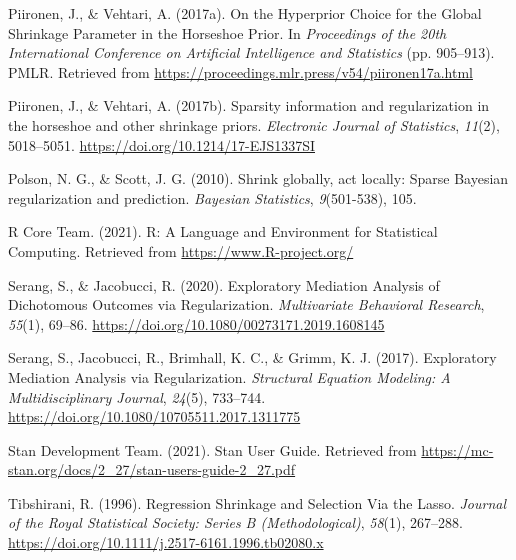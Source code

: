 \documentclass[
  man, donotrepeattitle,floatsintext]{apa6}
\newlength{\cslhangindent}
\newlength{\cslentryspacingunit} %
\newenvironment{CSLReferences}[2] %
 {%
  \setlength{\parindent}{0pt}
  \ifodd #1
  \let\oldpar\par
  \def\par{\hangindent=\cslhangindent\oldpar}
  \fi
  \setlength{\parskip}{#2\cslentryspacingunit}
 }%
 {}
\begin{document}
\begin{CSLReferences}{1}{0}
\leavevmode{}%
Piironen, J., \& Vehtari, A. (2017a). On the {Hyperprior} {Choice} for the {Global} {Shrinkage} {Parameter} in the {Horseshoe} {Prior}. In \emph{Proceedings of the 20th {International} {Conference} on {Artificial} {Intelligence} and {Statistics}} (pp. 905--913). PMLR. Retrieved from \url{https://proceedings.mlr.press/v54/piironen17a.html}

\leavevmode{}%
Piironen, J., \& Vehtari, A. (2017b). Sparsity information and regularization in the horseshoe and other shrinkage priors. \emph{Electronic Journal of Statistics}, \emph{11}(2), 5018--5051. \url{https://doi.org/10.1214/17-EJS1337SI}

\leavevmode{}%
Polson, N. G., \& Scott, J. G. (2010). Shrink globally, act locally: {Sparse} {Bayesian} regularization and prediction. \emph{Bayesian Statistics}, \emph{9}(501-538), 105.

\leavevmode{}%
R Core Team. (2021). R: {A} {Language} and {Environment} for {Statistical} {Computing}. Retrieved from \url{https://www.R-project.org/}

\leavevmode{}%
Serang, S., \& Jacobucci, R. (2020). Exploratory {Mediation} {Analysis} of {Dichotomous} {Outcomes} via {Regularization}. \emph{Multivariate Behavioral Research}, \emph{55}(1), 69--86. \url{https://doi.org/10.1080/00273171.2019.1608145}

\leavevmode{}%
Serang, S., Jacobucci, R., Brimhall, K. C., \& Grimm, K. J. (2017). Exploratory {Mediation} {Analysis} via {Regularization}. \emph{Structural Equation Modeling: A Multidisciplinary Journal}, \emph{24}(5), 733--744. \url{https://doi.org/10.1080/10705511.2017.1311775}

\leavevmode{}%
Stan Development Team. (2021). Stan {User} {Guide}. Retrieved from \url{https://mc-stan.org/docs/2_27/stan-users-guide-2_27.pdf}

\leavevmode{}%
Tibshirani, R. (1996). Regression {Shrinkage} and {Selection} {Via} the {Lasso}. \emph{Journal of the Royal Statistical Society: Series B (Methodological)}, \emph{58}(1), 267--288. \url{https://doi.org/10.1111/j.2517-6161.1996.tb02080.x}


\end{CSLReferences}
\end{document}
